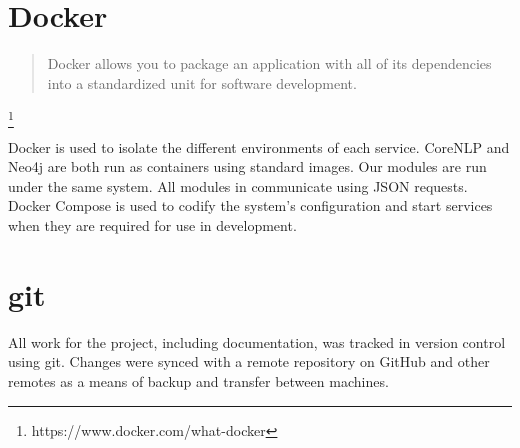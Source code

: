   \tocless\section{Docker}
    \blockquote{Docker allows you to package an application with all of its dependencies into a standardized unit for software development.}\footnote{https://www.docker.com/what-docker}

    Docker is used to isolate the different environments of each service. CoreNLP and Neo4j are both run as containers using standard images. Our modules are run under the same system. All modules in communicate using JSON requests. Docker Compose is used to codify the system's configuration and start services when they are required for use in development.

  \tocless\section{git}
    All work for the project, including documentation, was tracked in version control using git. Changes were synced with a remote repository on GitHub and other remotes as a means of backup and transfer between machines.
